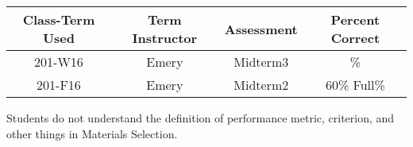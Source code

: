 \begin{outcomes}
	\begin{center}
		\begin{tabular}{cccc}
		\hline\hline
			Class-Term Used & Term Instructor & Assessment & Percent Correct\\
			\hline
			201-W16 & Emery & Midterm3 & \%\\    %
			201-F16 & Emery & Midterm2 & 60\% Full\%\\    %
			\hline
		\end{tabular}
	\end{center}
\end{outcomes}

\begin{comments}

Students do not understand the definition of performance metric, criterion, and other things in Materials Selection.
	
\end{comments}
